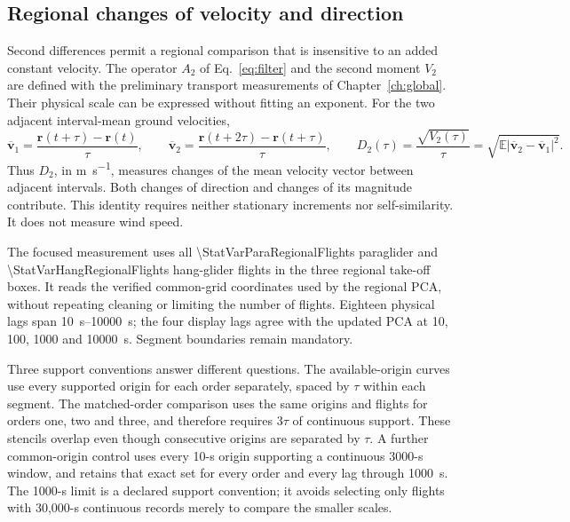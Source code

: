 \subsection{Regional changes of velocity and direction}
\label{sec:regional-variations}

Second differences permit a regional comparison that is insensitive to an added
constant velocity. The operator $A_2$ of Eq.~\eqref{eq:filter} and the second moment
$V_2$ are defined with the preliminary transport measurements of
Chapter~\ref{ch:global}. Their physical scale can be expressed without fitting an exponent.
For the two adjacent interval-mean ground velocities,
\begin{equation}
 \overline{\mathbf v}_1=\frac{\mathbf r(t+\tau)-\mathbf r(t)}{\tau},\qquad
 \overline{\mathbf v}_2=\frac{\mathbf r(t+2\tau)-\mathbf r(t+\tau)}{\tau},\qquad
 D_2(\tau)=\frac{\sqrt{V_2(\tau)}}{\tau}
 =\sqrt{\mathbb E|\overline{\mathbf v}_2-\overline{\mathbf v}_1|^2}.
 \label{eq:variation-velocity-change}
\end{equation}
Thus $D_2$, in \si{\metre\per\second}, measures changes of the mean velocity vector
between adjacent intervals. Both changes of direction and changes of its magnitude
contribute. This identity requires neither stationary increments nor self-similarity.
It does not measure wind speed.

The focused measurement uses all \num{\StatVarParaRegionalFlights} paraglider and
\num{\StatVarHangRegionalFlights} hang-glider flights in the three regional take-off
boxes. It reads the verified common-grid coordinates used by the regional PCA,
without repeating cleaning or limiting the number of flights. Eighteen physical
lags span \SIrange{10}{10000}{\second}; the four display lags agree with the updated
PCA at 10, 100, 1000 and \SI{10000}{\second}. Segment boundaries remain mandatory.

Three support conventions answer different questions. The available-origin curves
use every supported origin for each order separately, spaced by $\tau$ within each
segment. The matched-order comparison uses the same origins and flights for orders
one, two and three, and therefore requires $3\tau$ of continuous support. These
stencils overlap even though consecutive origins are separated by $\tau$. A further
common-origin control uses every 10-s origin supporting a continuous 3000-s window,
and retains that exact set for every order and every lag through \SI{1000}{\second}.
The 1000-s limit is a declared support convention; it avoids selecting only flights
with 30,000-s continuous records merely to compare the smaller scales.

